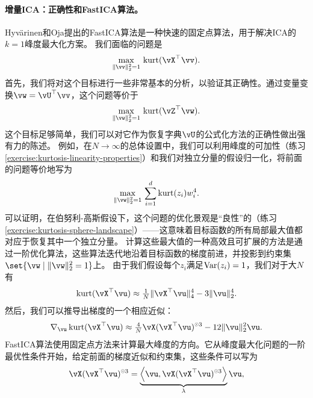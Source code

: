 \documentclass[../../book-main.tex]{subfiles}
\begin{document}
\paragraph{增量ICA：正确性和FastICA算法。}
Hyv\"{a}rinen和Oja提出的FastICA算法\cite{hyvarinen-1997}是一种快速的固定点算法，用于解决ICA的$k=1$峰度最大化方案。
我们面临的问题是
\begin{equation}\label{eq:kurtosis-maximization-sphere-finitesample}
    \max_{\norm{\vv}_2^2 = 1}\, \kurt(\vX^\top \vv).
\end{equation}
首先，我们将对这个目标进行一些非常基本的分析，以验证其正确性。通过变量变换$\vw = \vU^\top \vv$，这个问题等价于
\begin{equation*}
    \max_{\norm{\vw}_2^2 = 1}\, 
    \mathrm{kurt}(\vZ^\top \vw).
\end{equation*}
这个目标足够简单，我们可以对它作为恢复字典$\vU$的公式化方法的正确性做出强有力的陈述。
例如，在$N \to \infty$的总体设置中，我们可以利用峰度的可加性（练习\ref{exercise:kurtosis-linearity-properties}）和我们对独立分量的假设归一化，将前面的问题等价地写为
\begin{equation}\label{eq:kurtosis-maximization-sphere-population-simple}
    \max_{\norm{\vw}_2^2 = 1}\, 
    \sum_{i=1}^d \mathrm{kurt}(z_i) w_i^4.
\end{equation}
可以证明，在伯努利-高斯假设下，这个问题的优化景观是“良性”的（练习\ref{exercise:kurtosis-sphere-landscape}）——这意味着目标函数的所有局部最大值都对应于恢复其中一个独立分量。
计算这些最大值的一种高效且可扩展的方法是通过一阶优化算法，这些算法迭代地沿着目标函数的梯度前进，并投影到约束集$\set{\vw \given \norm{\vw}_2^2 = 1}$上。
由于我们假设每个$z_i$满足$\operatorname{Var}(z_i)=1$，我们对于大$N$有
\begin{equation}\label{eq:kurtosis-approximation-l4}
    \kurt(\vX^\top \vu)
    \approx
    \tfrac{1}{N} \norm{\vX^\top \vu}_4^4 - 3 \norm{\vu}_2^4.
\end{equation}
然后，我们可以推导出梯度的一个相应近似：
\begin{equation*}
    \nabla_{\vu} \kurt(\vX^\top \vu)
    \approx
    \tfrac{4}{N} \vX (\vX^\top \vu)^{\hada 3}
    - 12 \norm{\vu}_2^2 \vu.
\end{equation*}
FastICA算法使用固定点方法来计算最大峰度的方向。它从峰度最大化问题的一阶最优性条件开始，给定前面的梯度近似和约束集，这些条件可以写为
\begin{align}\label{eq:kurtosis-max-sphere-stationarity}
   \vX (\vX^\top \vu)^{\hada 3} 
   = 
   \underbrace{
   \ip*{\vu}{
   \vX (\vX^\top \vu)^{\hada 3} 
   }}_{\lambda} \vu,
\end{align}
\end{document}
